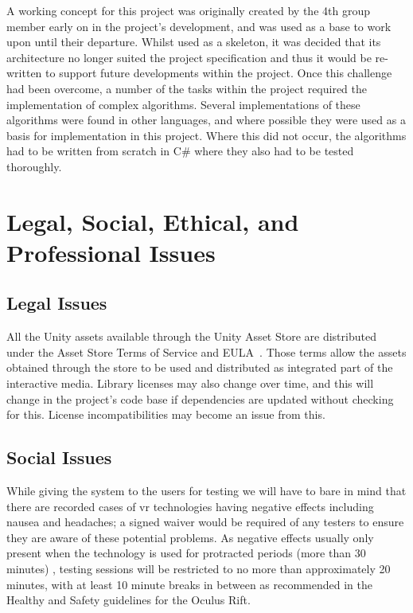         A working concept for this project was originally created by the 4th group member early on in the project's development, and was used as a base to work upon until their departure. Whilst used as a skeleton, it was decided that its architecture no longer suited the project specification and thus it would be re-written to support future developments within the project. Once this challenge had been overcome, a number of the tasks within the project required the implementation of complex algorithms. Several implementations of these algorithms were found in other languages, and where possible they were used as a basis for implementation in this project. Where this did not occur, the algorithms had to be written from scratch in C\# where they also had to be tested thoroughly.

\section{Legal, Social, Ethical, and Professional Issues}

    \subsection{Legal Issues}
    \label{sec:legal}
        All the Unity assets available through the Unity Asset Store are distributed under the Asset Store Terms of Service and EULA~\cite{unity:terms}. Those terms allow the assets obtained through the store to be used and distributed as integrated part of the interactive media. Library licenses may also change over time, and this will change in the project's code base if dependencies are updated without checking for this. License incompatibilities may become an issue from this.
        
    \subsection{Social Issues}
        While giving the system to the users for testing we will have to bare in mind that there are recorded cases of \acrshort{vr} technologies having negative effects including nausea and headaches; a signed waiver would be required of any testers to ensure they are aware of these potential problems. As negative effects usually only present when the technology is used for protracted periods (more than 30 minutes) \cite{occulus_health_and_safety}, testing sessions will be restricted to no more than approximately 20 minutes, with at least 10 minute breaks in between as recommended in the Healthy and Safety guidelines for the Oculus Rift.
    
